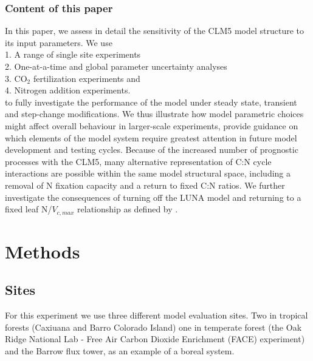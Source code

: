 \documentclass[draft,linenumbers]{agujournal}
\begin{document}
\subsubsection{Content of this paper}
In this paper, we assess in detail the sensitivity of the CLM5 model structure to its input parameters. We use\\
1. A range of single site experiments \\
2. One-at-a-time and global parameter uncertainty analyses\\
3. CO$_{2}$ fertilization experiments and\\
4. Nitrogen addition experiments.\\
to fully investigate the performance of the model under steady state, transient and step-change modifications. We thus illustrate how model parametric choices might affect overall behaviour in larger-scale experiments,  provide guidance on which elements of the model system require greatest attention in future model development and testing cycles. 
Because of the increased number of prognostic processes with the CLM5, many alternative representation of C:N cycle interactions are possible within the same model structural space, including a removal of N fixation capacity and a return to fixed C:N ratios. We further investigate the consequences of turning off the LUNA model and returning to a fixed leaf N/$V_{c,max}$ relationship as defined by \cite{ghimire2016}. 

\section{Methods}

\subsection{Sites}
For this experiment we use three different model evaluation sites. Two in tropical forests (Caxiuana and Barro Colorado Island) one in temperate forest (the Oak Ridge National Lab - Free Air Carbon Dioxide Enrichment (FACE) experiment) and the Barrow flux tower, as an example of a boreal system. 
\end{document}
